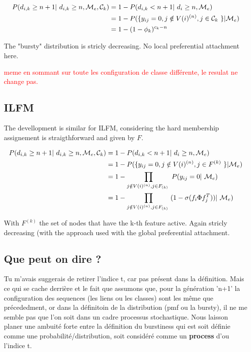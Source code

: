 \documentclass{article}
\begin{document}
\begin{align*}
    P(d_{i,k} \geq n+1 | d_{i,k} \geq n, \mathcal{M}_e, \C_k) &= 1 - P(d_{i,k} < n+1 | d_i \geq n, \mathcal{M}_e) \\
                                 &= 1 - P( \{ y_{ij}=0, j\notin V(i)^{(n)}, j\in \C_k   \} | \mathcal{M}_e) \\
                                 &= 1 - (1 - \phi_k)^{c_k -n}
\end{align*}

The "bursty" distribution is stricly decreasing. No local preferential attachment here.

\textcolor{red}{meme en sommant sur toute les configuration de classe différente, le resulat ne change pas.}

\subsection{ILFM}

The devellopment is similar for ILFM, considering the hard membership assignement is straigthforward and given by $F$.

\begin{align*}
    P(d_{i,k} \geq n+1 | d_{i,k} \geq n, \mathcal{M}_e, \C_k) &= 1 - P(d_{i,k} < n+1 | d_i \geq n, \mathcal{M}_e) \\
                                 &= 1 - P( \{ y_{ij}=0, j\notin V(i)^{(n)}, j\in F^{(k)} \} |\mathcal{M}_e) \\
                                 &= 1 - \prod_{j\notin V(i)^{(n)}, j\in F_{(k)} }P( y_{ij}=0 |  \mathcal{M}_e) \\
                                 &= 1 - \prod_{j\notin V(i)^{(n)}, j\in F_{(k)} }(1- \sigma(f_i\Phi f_j^T))|  \mathcal{M}_e)
\end{align*}

With $F^{(k)}$ the set of nodes that have the k-th feature active. Again stricly decreasing (with the approach used with the global preferential attachment.




\subsection{Que peut on dire ?}

Tu m'avais suggerais de retirer l'indice t, car pas présent dans la définition. Mais ce qui se cache derrière et le fait que assumons que, pour la génération 'n+1' la configuration des sequences (les liens ou les classes) sont les même que précededment, or dans la définitoin de la distribution (pmf ou la bursty), il ne me semble pas que l'on soit dans un cadre processus stochastique. Nous laisson planer une ambuité forte entre la définition du burstiness qui est soit définie comme une probabilité/distribution, soit considéré comme un \textbf{process} d'ou l'indice t.
\end{document}
